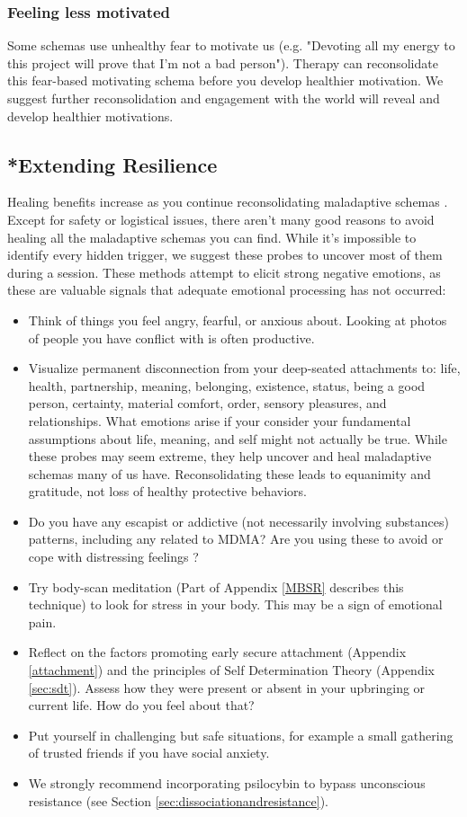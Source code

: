 \documentclass[12pt,letterpaper]{article}
\begin{document}
\subsubsection{Feeling less motivated} 
Some schemas use unhealthy fear to motivate us (e.g. "Devoting all my energy to this project will prove that I'm not a bad person"). Therapy can reconsolidate this fear-based motivating schema before you develop healthier motivation. We suggest further reconsolidation and engagement with the world will reveal and develop healthier motivations.
\subsection{*Extending Resilience}
\label{completed}
Healing benefits increase as you continue reconsolidating maladaptive schemas \cite{rachmanProcessing}. Except for safety or logistical issues, there aren't many good reasons to avoid healing all the maladaptive schemas you can find. While it's impossible to identify every hidden trigger, we suggest these probes to uncover most of them during a session. These methods attempt to elicit strong negative emotions, as these are valuable signals that adequate emotional processing has not occurred:
\begin{itemize}
    \item Think of things you feel angry, fearful, or anxious about. Looking at photos of people you have conflict with is often productive.
    \item Visualize permanent disconnection from your deep-seated attachments to: life, health, partnership, meaning, belonging, existence, status, being a good person, certainty, material comfort, order, sensory pleasures, and relationships. What emotions arise if your consider your fundamental assumptions about life, meaning, and self might not actually be true. While these probes may seem extreme, they help uncover and heal maladaptive schemas many of us have. Reconsolidating these leads to equanimity and gratitude, not loss of healthy protective behaviors.
    \item Do you have any escapist or addictive (not necessarily involving substances) patterns, including any related to MDMA? Are you using these to avoid or cope with distressing feelings \cite{forsterTraumaAddiction,alaviBehavioralAddiction}?
    \item Try body-scan meditation (Part of Appendix \ref{MBSR} describes this technique) to look for stress in your body. This may be a sign of emotional pain.
    \item Reflect on the factors promoting early secure attachment (Appendix \ref{attachment}) and the principles of Self Determination Theory (Appendix \ref{sec:sdt}). Assess how they were present or absent in your upbringing or current life. How do you feel about that?
    \item Put yourself in challenging but safe situations, for example a small gathering of trusted friends if you have social anxiety.
    \item We strongly recommend incorporating psilocybin to bypass unconscious resistance (see Section \ref{sec:dissociationandresistance}).
\end{itemize}
\end{document}
